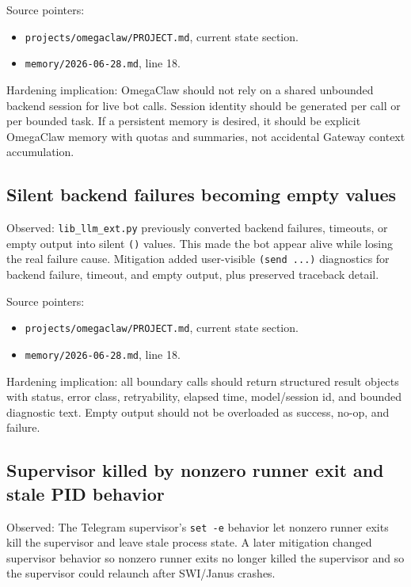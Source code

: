 \documentclass[11pt]{article}
\begin{document}
Source pointers:
\begin{itemize}
  \item \texttt{projects/omegaclaw/PROJECT.md}, current state section.
  \item \texttt{memory/2026-06-28.md}, line 18.
\end{itemize}

Hardening implication: OmegaClaw should not rely on a shared unbounded backend session for live bot calls. Session identity should be generated per call or per bounded task. If a persistent memory is desired, it should be explicit OmegaClaw memory with quotas and summaries, not accidental Gateway context accumulation.

\subsection{Silent backend failures becoming empty values}

Observed: \texttt{lib\_llm\_ext.py} previously converted backend failures, timeouts, or empty output into silent \texttt{()} values. This made the bot appear alive while losing the real failure cause. Mitigation added user-visible \texttt{(send ...)} diagnostics for backend failure, timeout, and empty output, plus preserved traceback detail.

Source pointers:
\begin{itemize}
  \item \texttt{projects/omegaclaw/PROJECT.md}, current state section.
  \item \texttt{memory/2026-06-28.md}, line 18.
\end{itemize}

Hardening implication: all boundary calls should return structured result objects with status, error class, retryability, elapsed time, model/session id, and bounded diagnostic text. Empty output should not be overloaded as success, no-op, and failure.

\subsection{Supervisor killed by nonzero runner exit and stale PID behavior}

Observed: The Telegram supervisor's \texttt{set -e} behavior let nonzero runner exits kill the supervisor and leave stale process state. A later mitigation changed supervisor behavior so nonzero runner exits no longer killed the supervisor and so the supervisor could relaunch after SWI/Janus crashes.
\end{document}
